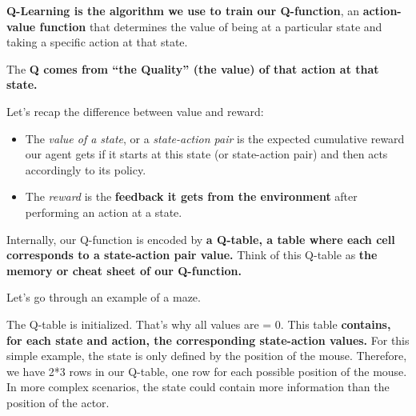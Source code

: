 \documentclass[11pt,a4paper]{article}
\begin{document}
\textbf{Q-Learning is the algorithm we use to train our Q-function}, an \textbf{action-value function} that determines the value of being at a particular state and taking a specific action at that state.


The \textbf{Q comes from ``the Quality'' (the value) of that action at that state.}

Let's recap the difference between value and reward:

\begin{itemize}
\tightlist
\item
  The \emph{value of a state}, or a \emph{state-action pair} is the expected cumulative reward our agent gets if it starts at this state (or state-action pair) and then acts accordingly to its policy.
\item
  The \emph{reward} is the \textbf{feedback it gets from the environment} after performing an action at a state.
\end{itemize}

Internally, our Q-function is encoded by \textbf{a Q-table, a table where each cell corresponds to a state-action pair value.} Think of this Q-table as \textbf{the memory or cheat sheet of our Q-function.}

Let's go through an example of a maze.


The Q-table is initialized. That's why all values are = 0. This table \textbf{contains, for each state and action, the corresponding state-action values.} For this simple example, the state is only defined by the position of the mouse. Therefore, we have 2*3 rows in our Q-table, one row for each possible position of the mouse. In more complex scenarios, the state could contain more information than the position of the actor.

\end{document}
